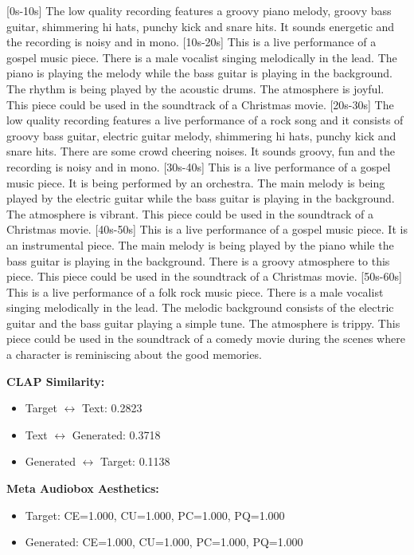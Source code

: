 \documentclass{article}
\begin{document}
\small
[0s-10s] The low quality recording features a groovy piano melody, groovy bass guitar, shimmering hi hats, punchy kick and snare hits. It sounds energetic and the recording is noisy and in mono. [10s-20s] This is a live performance of a gospel music piece. There is a male vocalist singing melodically in the lead. The piano is playing the melody while the bass guitar is playing in the background. The rhythm is being played by the acoustic drums. The atmosphere is joyful. This piece could be used in the soundtrack of a Christmas movie. [20s-30s] The low quality recording features a live performance of a rock song and it consists of groovy bass guitar, electric guitar melody, shimmering hi hats, punchy kick and snare hits. There are some crowd cheering noises. It sounds groovy, fun and the recording is noisy and in mono. [30s-40s] This is a live performance of a gospel music piece. It is being performed by an orchestra. The main melody is being played by the electric guitar while the bass guitar is playing in the background. The atmosphere is vibrant. This piece could be used in the soundtrack of a Christmas movie. [40s-50s] This is a live performance of a gospel music piece. It is an instrumental piece. The main melody is being played by the piano while the bass guitar is playing in the background. There is a groovy atmosphere to this piece. This piece could be used in the soundtrack of a Christmas movie. [50s-60s] This is a live performance of a folk rock music piece. There is a male vocalist singing melodically in the lead. The melodic background consists of the electric guitar and the bass guitar playing a simple tune. The atmosphere is trippy. This piece could be used in the soundtrack of a comedy movie during the scenes where a character is reminiscing about the good memories.
\normalsize

\textbf{CLAP Similarity:}
\begin{itemize}
    \item Target $\leftrightarrow$ Text: 0.2823
    \item Text $\leftrightarrow$ Generated: 0.3718
    \item Generated $\leftrightarrow$ Target: 0.1138
\end{itemize}

\textbf{Meta Audiobox Aesthetics:}
\begin{itemize}
    \item Target: CE=1.000, CU=1.000, PC=1.000, PQ=1.000
    \item Generated: CE=1.000, CU=1.000, PC=1.000, PQ=1.000
\end{itemize}
\end{document}
